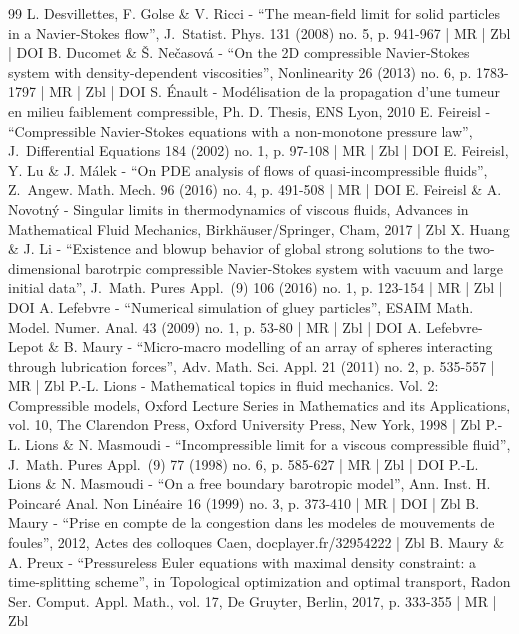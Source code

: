 \begin{thebibliography}{99}
L. Desvillettes, F. Golse \& V. Ricci - “The mean-field limit for solid particles in a Navier-Stokes flow”, J. Statist. Phys. 131 (2008) no. 5, p. 941-967 | MR | Zbl | DOI
B. Ducomet \& Š. Nečasová - “On the 2D compressible Navier-Stokes system with density-dependent viscosities”, Nonlinearity 26 (2013) no. 6, p. 1783-1797 | MR | Zbl | DOI
S. Énault - Modélisation de la propagation d’une tumeur en milieu faiblement compressible, Ph. D. Thesis, ENS Lyon, 2010
E. Feireisl - “Compressible Navier-Stokes equations with a non-monotone pressure law”, J. Differential Equations 184 (2002) no. 1, p. 97-108 | MR | Zbl | DOI
E. Feireisl, Y. Lu \& J. Málek - “On PDE analysis of flows of quasi-incompressible fluids”, Z. Angew. Math. Mech. 96 (2016) no. 4, p. 491-508 | MR | DOI
E. Feireisl \& A. Novotný - Singular limits in thermodynamics of viscous fluids, Advances in Mathematical Fluid Mechanics, Birkhäuser/Springer, Cham, 2017 | Zbl
X. Huang \& J. Li - “Existence and blowup behavior of global strong solutions to the two-dimensional barotrpic compressible Navier-Stokes system with vacuum and large initial data”, J. Math. Pures Appl. (9) 106 (2016) no. 1, p. 123-154 | MR | Zbl | DOI
A. Lefebvre - “Numerical simulation of gluey particles”, ESAIM Math. Model. Numer. Anal. 43 (2009) no. 1, p. 53-80 | MR | Zbl | DOI
A. Lefebvre-Lepot \& B. Maury - “Micro-macro modelling of an array of spheres interacting through lubrication forces”, Adv. Math. Sci. Appl. 21 (2011) no. 2, p. 535-557 | MR | Zbl
P.-L. Lions - Mathematical topics in fluid mechanics. Vol. 2: Compressible models, Oxford Lecture Series in Mathematics and its Applications, vol. 10, The Clarendon Press, Oxford University Press, New York, 1998 | Zbl
P.-L. Lions \& N. Masmoudi - “Incompressible limit for a viscous compressible fluid”, J. Math. Pures Appl. (9) 77 (1998) no. 6, p. 585-627 | MR | Zbl | DOI
P.-L. Lions \& N. Masmoudi - “On a free boundary barotropic model”, Ann. Inst. H. Poincaré Anal. Non Linéaire 16 (1999) no. 3, p. 373-410 | MR | DOI | Zbl
B. Maury - “Prise en compte de la congestion dans les modeles de mouvements de foules”, 2012, Actes des colloques Caen, docplayer.fr/32954222 | Zbl
B. Maury \& A. Preux - “Pressureless Euler equations with maximal density constraint: a time-splitting scheme”, in Topological optimization and optimal transport, Radon Ser. Comput. Appl. Math., vol. 17, De Gruyter, Berlin, 2017, p. 333-355 | MR | Zbl

\end{thebibliography}

